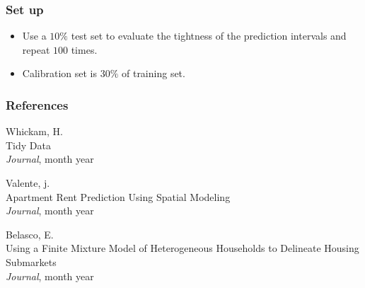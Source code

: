 \documentclass{beamer}
\begin{document}
\begin{frame} \frametitle{Set up}
\begin{itemize}
	\item Use a $10\%$ test set to evaluate the tightness of the prediction intervals and repeat $100$ times.
	\item Calibration set is $30\%$ of training set.
\end{itemize}
\end{frame}





\begin{frame}
\frametitle{References}
\footnotesize{
	\begin{thebibliography}{99} %
		
		 Whickam, H. \\
		\newblock Tidy Data\\
		\newblock \emph{Journal}, month year
		
		 Valente, j. \\
		\newblock Apartment Rent Prediction Using Spatial Modeling\\
		\newblock \emph{Journal}, month year
		
		 Belasco, E. \\
		\newblock Using a Finite Mixture Model of Heterogeneous Households to Delineate Housing Submarkets\\
		\newblock \emph{Journal}, month year
		
	\end{thebibliography}
}
\end{frame}
    
\end{document}
